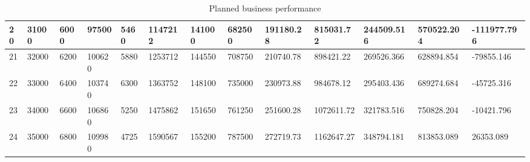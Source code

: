 \begin{table}[]
{\begin{tabular}{|l|l|l|l|l|l|l|l|l|l|l|l|l|}
        20    & 31000     & 6000          & 97500                                                 & 5460                                                           & 1147212                                                  & 141000                                                     & 682500                                                          & 191180.28 & 815031.72  & 244509.516    & 570522.204       & -111977.796     \\ \hline
        21    & 32000     & 6200          & 100620                                                & 5880                                                           & 1253712                                                  & 144550                                                     & 708750                                                          & 210740.78 & 898421.22  & 269526.366    & 628894.854       & -79855.146      \\ \hline
        22    & 33000     & 6400          & 103740                                                & 6300                                                           & 1363752                                                  & 148100                                                     & 735000                                                          & 230973.88 & 984678.12  & 295403.436    & 689274.684       & -45725.316      \\ \hline
        23    & 34000     & 6600          & 106860                                                & 5250                                                           & 1475862                                                  & 151650                                                     & 761250                                                          & 251600.28 & 1072611.72 & 321783.516    & 750828.204       & -10421.796      \\ \hline
        24    & 35000     & 6800          & 109980                                                & 4725                                                           & 1590567                                                  & 155200                                                     & 787500                                                          & 272719.73 & 1162647.27 & 348794.181    & 813853.089       & 26353.089       \\ \hline
    \end{tabular}}
    \caption{Planned business performance}
    \label{fig:budget}
\end{table}


